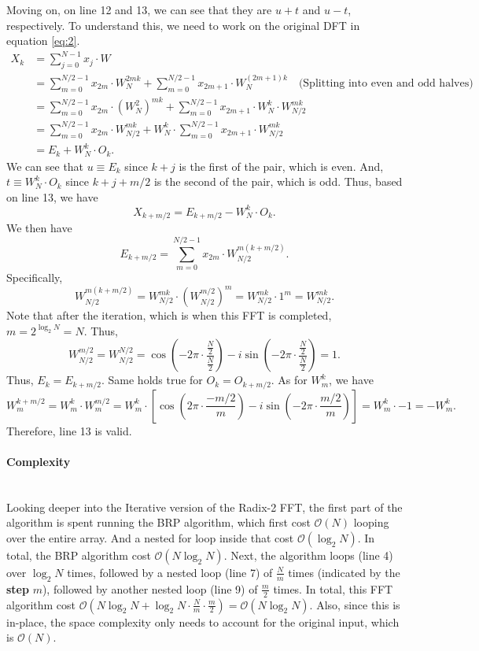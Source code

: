 \documentclass{article}
\begin{document}
Moving on, on line 12 and 13, we can see that they are $u + t$ and $u - t$, respectively. To understand this, we need to work on the original DFT in equation \ref{eq:2}.
\begin{equation}
  \begin{aligned}
    X_k &= \sum_{j=0}^{N-1} x_j \cdot W \\ 
        &= \sum_{m=0}^{N/2-1} x_{2m} \cdot W^{2mk}_{N} + \sum_{m=0}^{N/2-1} x_{2m+1} \cdot W^{(2m+1)k}_{N} \quad \text{(Splitting into even and odd halves)}
     \\ &= \sum_{m=0}^{N/2-1} x_{2m}\cdot (W^{2}_{N})^{mk} + \sum_{m=0}^{N/2-1} x_{2m+1}\cdot W^{k}_{N} \cdot W^{mk}_{N/2} \\ 
        &= \sum_{m=0}^{N/2-1} x_{2m}\cdot W_{N/2}^{mk} + W^{k}_{N} \cdot\sum_{m=0}^{N/2-1} x_{2m+1}\cdot  W^{mk}_{N/2} \\
        &= E_k + W^{k}_{N} \cdot O_k.
\end{aligned}
\end{equation}
We can see that $u \equiv E_k$ since $k+j$ is the first of the pair, which is even. And, $t \equiv W^{k}_{N} \cdot O_k$ since $k+j+m/2$ is the second of the pair, which is odd. Thus, based on line 13, we have
$$
X_{k+m/2} = E_{k+m/2} - W^k_N \cdot O_k.
$$
We then have 
$$
  E_{k+m/2} = \sum_{m=0}^{N/2-1} x_{2m}\cdot W_{N/2}^{m(k+m/2)}.
$$
Specifically, 
$$
W_{N/2}^{m(k+m/2)} = W^{mk}_{N/2} \cdot \left(W^{m/2}_{N/2}\right)^m = W^{mk}_{N/2} \cdot 1^m = W^{mk}_{N/2}.
$$
Note that after the iteration, which is when this FFT is completed, $m = 2^{\log_2N} = N$. Thus, 
$$
W^{m/2}_{N/2} = W^{N/2}_{N/2} = \cos\left(-2 \pi \cdot \frac{\frac{N}{2}}{\frac{N}{2}}\right)  -i \sin\left(-2\pi\cdot \frac{\frac{N}{2}}{\frac{N}{2}}\right) = 1.
$$
Thus, $E_k = E_{k+m/2}$.
Same holds true for $O_k = O_{k+m/2}$. As for $W^k_m$, we have 
$$
W^{k+m/2}_m = W^{k}_m \cdot W^{m/2}_m = W^{k}_m \cdot \left[\cos\left(2\pi\cdot \frac{-m/2}{m}\right) -i \sin\left(-2\pi\cdot \frac{m/2}{m}\right)\right] = W^{k}_m \cdot -1 =- W^{k}_m.
$$ Therefore, line 13 is valid.
\paragraph{Complexity}~{}\\
Looking deeper into the Iterative version of the Radix-2 FFT, the first part of the algorithm is spent running the BRP algorithm, which first cost $\mathcal{O}(N)$ looping over the entire array. And a nested for loop inside that cost $\mathcal{O}(\log_2N)$. In total, the BRP algorithm cost $\mathcal{O}(N\log_2N)$. Next, the algorithm loops (line 4) over $\log_2N$ times, followed by a nested loop (line 7) of $\frac{N}{m}$ times (indicated by the \textbf{step} $m$), followed by another nested loop (line 9) of $\frac{m}{2}$ times. In total, this FFT algorithm cost $\mathcal{O}\left(N\log_2N + \log_2N \cdot \frac{N}{m} \cdot \frac{m}{2}\right) = \mathcal{O}(N\log_2N)$. Also, since this is in-place, the space complexity only needs to account for the original input, which is $\mathcal{O}(N)$.
\end{document}
